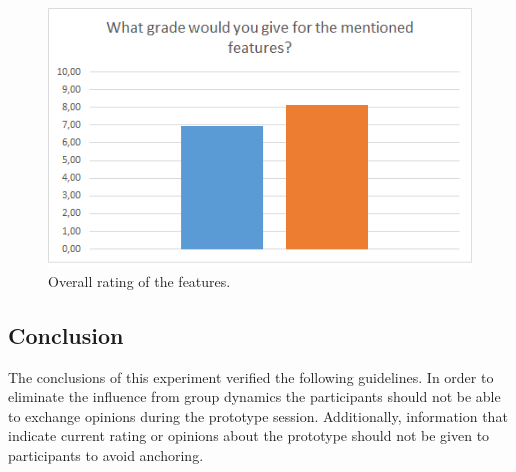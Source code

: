 \documentclass[Main.tex]{subfiles}
\begin{document}
\begin{figure}
\includegraphics[width=\textwidth]{FinalGrade.png}
\caption{Overall rating of the features.}
\label{fig:final}
\end{figure}

\subsection{Conclusion}
The conclusions of this experiment verified the following guidelines. In order to eliminate the influence from group dynamics the participants should not be able to exchange opinions during the prototype session. Additionally, information that indicate current rating or opinions about the prototype should not be given to participants to avoid anchoring.

\end{document}

